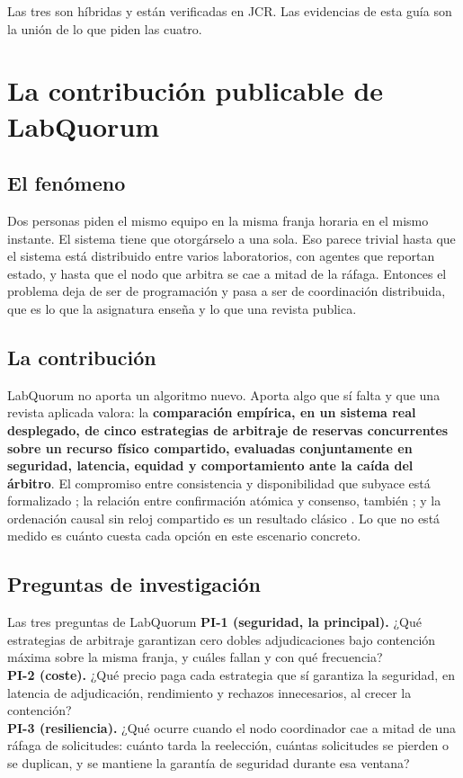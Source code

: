 \documentclass[11pt,a4paper]{article}
\begin{document}
Las tres son híbridas y están verificadas en JCR. Las evidencias de esta guía son la unión de lo que piden las cuatro.

\section{La contribución publicable de LabQuorum}

\subsection{El fenómeno}

Dos personas piden el mismo equipo en la misma franja horaria en el mismo instante. El sistema tiene que otorgárselo a una sola. Eso parece trivial hasta que el sistema está distribuido entre varios laboratorios, con agentes que reportan estado, y hasta que el nodo que arbitra se cae a mitad de la ráfaga. Entonces el problema deja de ser de programación y pasa a ser de coordinación distribuida, que es lo que la asignatura enseña y lo que una revista publica.

\subsection{La contribución}

LabQuorum no aporta un algoritmo nuevo. Aporta algo que sí falta y que una revista aplicada valora: la \textbf{comparación empírica, en un sistema real desplegado, de cinco estrategias de arbitraje de reservas concurrentes sobre un recurso físico compartido, evaluadas conjuntamente en seguridad, latencia, equidad y comportamiento ante la caída del árbitro}. El compromiso entre consistencia y disponibilidad que subyace está formalizado \cite{gilbert2002brewer}; la relación entre confirmación atómica y consenso, también \cite{gray2006consensus}; y la ordenación causal sin reloj compartido es un resultado clásico \cite{lamport1978time}. Lo que no está medido es cuánto cuesta cada opción en este escenario concreto.

\subsection{Preguntas de investigación}

\begin{aviso}{Las tres preguntas de LabQuorum}
	\textbf{PI-1 (seguridad, la principal).} ¿Qué estrategias de arbitraje garantizan cero dobles adjudicaciones bajo contención máxima sobre la misma franja, y cuáles fallan y con qué frecuencia?\\[6pt]
	\textbf{PI-2 (coste).} ¿Qué precio paga cada estrategia que sí garantiza la seguridad, en latencia de adjudicación, rendimiento y rechazos innecesarios, al crecer la contención?\\[6pt]
	\textbf{PI-3 (resiliencia).} ¿Qué ocurre cuando el nodo coordinador cae a mitad de una ráfaga de solicitudes: cuánto tarda la reelección, cuántas solicitudes se pierden o se duplican, y se mantiene la garantía de seguridad durante esa ventana?
\end{aviso}
\end{document}
